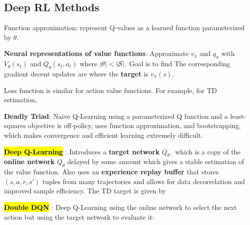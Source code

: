 \documentclass{article}
\begin{document}
\subsection{Deep RL Methods}
  
  Function approximation: represent Q-values as a learned function parameterized by $\theta$. 

  \textbf{Neural representations of value functions}: Approximate $v_\pi$ and $q_\pi$ with $V_\theta(s_t)$ and $Q_\theta(s_t,a_t)$ where $\left\lvert \theta \right\rvert<\left\lvert \mathcal{S} \right\rvert$. Goal is to find
  The corresponding gradient decent updates are
  where the \textbf{target} is $v_\pi(s)$.

  Loss function is similar for action value functions. For example, for TD estimation,

  \textbf{Deadly Triad}: Naive Q-Learning using a parameterized Q function and a least-squares objective
  is off-policy, uses function approximation, and bootstrapping, which makes convergence and efficient learning extremely difficult. 

  \hl{\textbf{Deep Q-Learning}} \cite{mnih2015human}: Introduces a \textbf{target network} $Q_{\theta^-}$ which is a copy of the \textbf{online network} $Q_\theta$ delayed by some amount which gives a stable estimation of the value function. Also uses an \textbf{experience replay buffer} that stores $(s,a,r,s')$ tuples from many trajectories and allows for data decorrelation and improved sample efficiency. The TD target is given by

  \hl{\textbf{Double DQN}} \cite{van2016deep}: Deep Q-Learning using the online network to select the next action but using the target network to evaluate it:
\end{document}
